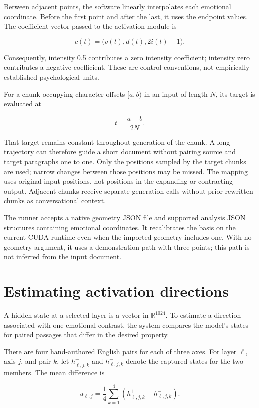 \documentclass[manuscript,screen,nonacm]{acmart}
\begin{document}
Between adjacent points, the software linearly interpolates each
emotional coordinate. Before the first point and after the last, it uses
the endpoint values. The coefficient vector passed to the activation
module is

\[
c(t)=\bigl(v(t),d(t),2i(t)-1\bigr).
\]

Consequently, intensity 0.5 contributes a zero intensity coefficient;
intensity zero contributes a negative coefficient. These are control
conventions, not empirically established psychological units.

For a chunk occupying character offsets \([a,b)\) in an input of length
\(N\), its target is evaluated at

\[
t=\frac{a+b}{2N}.
\]

That target remains constant throughout generation of the chunk. A long
trajectory can therefore guide a short document without pairing source
and target paragraphs one to one. Only the positions sampled by the
target chunks are used; narrow changes between those positions may be
missed. The mapping uses original input positions, not positions in the
expanding or contracting output. Adjacent chunks receive separate
generation calls without prior rewritten chunks as conversational
context.

The runner accepts a native geometry JSON file and supported analysis
JSON structures containing emotional coordinates. It recalibrates the
basis on the current CUDA runtime even when the imported geometry
includes one. With no geometry argument, it uses a demonstration path
with three points; this path is not inferred from the input document.


\section{Estimating activation
directions}\label{estimating-activation-directions}

A hidden state at a selected layer is a vector in \(\mathbb{R}^{1024}\).
To estimate a direction associated with one emotional contrast, the
system compares the model's states for paired passages that differ in
the desired property.

There are four hand-authored English pairs for each of three axes. For
layer \(\ell\), axis \(j\), and pair \(k\), let \(h^+_{\ell,j,k}\) and
\(h^-_{\ell,j,k}\) denote the captured states for the two members. The
mean difference is

\[
u_{\ell,j}=\frac14\sum_{k=1}^{4}
\left(h^+_{\ell,j,k}-h^-_{\ell,j,k}\right).
\]
\end{document}
